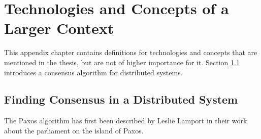 
\cleardoublepage
\chapter{Technologies and Concepts of a Larger Context}

This appendix chapter contains definitions for technologies and concepts that are mentioned in the thesis, but are not of higher importance for it. Section \ref{sec:paxos} introduces a consensus algorithm for distributed systems.

\section{Finding Consensus in a Distributed System}
\label{sec:paxos}

The Paxos algorithm has first been described by Leslie Lamport in their work about the parliament on the island of Paxos.